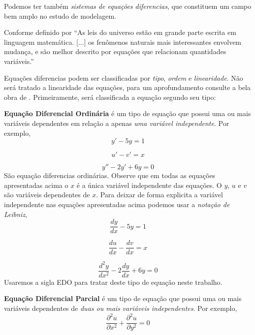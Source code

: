 Podemos ter também  \emph{sistemas de equações diferencias}, que constituem um campo bem
amplo no estudo de modelagem.

Conforme definido por  ``As leis do universo estão em grande parte escrita em
linguagem matemática. [...] os fenômenos naturais mais interessantes envolvem 
mudança, e são melhor descrito por equações que relacionam quantidades variáveis.''


Equações diferencias podem ser classificadas por \emph{tipo}, \emph{ordem} e \emph{linearidade}.
Não será tratado a linearidade das equações, para um aprofundamento consulte a bela obra de \cite{zill}.
Primeiramente, será classificada a equação segundo seu tipo:

\textbf{Equação Diferencial Ordinária} é um tipo de equação que 
possui uma ou mais variáveis dependentes em relação a apenas 
\emph{uma variável independente}. Por exemplo,
\begin{equation*}
y' - 5y = 1
\end{equation*}

\begin{equation*}
u' - v' = x
\end{equation*}

\begin{equation*}
y'' -2y' + 6y = 0
\end{equation*}
São equação diferencias ordinárias. Observe que em todas as equações
apresentadas acima o $x$ é a única variável independente das equações.
O $y$, $u$ e $v$ são variáveis dependentes de $x$.
Para deixar de forma explicita a variável independente nas equações 
apresentadas acima podemos usar a \emph{notação de Leibniz},
\begin{equation*}
\frac{dy}{dx} - 5y = 1
\end{equation*}

\begin{equation*}
\frac{du}{dx} - \frac{dv}{dx} = x
\end{equation*}

\begin{equation*}
\frac{d^{2}y}{dx^{2}} -2\frac{dy}{dx} + 6y = 0
\end{equation*}
Usaremos a sigla EDO para tratar deste tipo de equação neste trabalho.

\textbf{Equação Diferencial Parcial} é um tipo de equação que 
possui uma ou mais variáveis dependentes de 
\emph{duas ou mais variáveis independentes}. Por exemplo,
\begin{equation*}
\frac{\partial^{2}u}{\partial x^{2}} + \frac{\partial^{2}u}{\partial y^{2}} = 0
\end{equation*}

